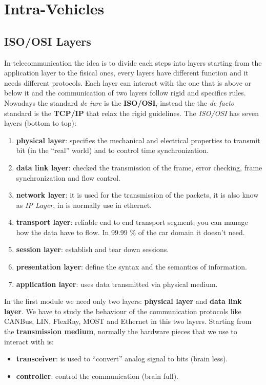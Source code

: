 \chapter{Intra-Vehicles}

\section{ISO/OSI Layers}
In telecommunication the idea is to divide each steps into layers starting from the application layer to the fisical ones, every layers have different function and it needs different protocols. Each layer can interact with the one that is above or below it and the communication of two layers follow rigid and specifics rules. Nowadays the standard \textit{de iure} is the \textbf{ISO/OSI}, instead the the \textit{de facto} standard is the \textbf{TCP/IP} that relax the rigid guidelines. The \textit{ISO/OSI} has seven layers (bottom to top):
\begin{enumerate}[nosep]
    \item \textbf{physical layer}: specifies the mechanical and electrical properties to transmit bit (in the ``real'' world) and to control time synchronization.
    \item \textbf{data link layer}: checked the transmission of the frame, error checking, frame synchronization and flow control.
    \item \textbf{network layer}: it is used for the transmission of the packets, it is also know as \textit{IP Layer}, in is normally use in ethernet.
    \item \textbf{transport layer}: reliable end to end transport segment, you can manage how the data have to flow. In 99.99 \% of the car domain it doesn't need.
    \item \textbf{session layer}: establish and tear down sessions.
    \item \textbf{presentation layer}: define the syntax and the semantics of information.
    \item \textbf{application layer}: uses data transmitted via physical medium.
\end{enumerate}
In the first module we need only two layers: \textbf{physical layer} and \textbf{data link layer}. We have to study the behaviour of the communication protocols like CANBus, LIN, FlexRay, MOST and Ethernet in this two layers. Starting from the \textbf{transmission medium}, normally the hardware pieces that we use to interact with is:
\begin{itemize}[nosep]
    \item \textbf{transceiver}: is used to ``convert'' analog signal to bits (brain less).
    \item \textbf{controller}: control the communication (brain full).
\end{itemize}

